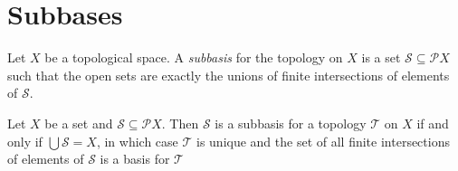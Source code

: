 \section{Subbases}

\begin{df}[Subbasis]
  Let $X$ be a topological space. A \emph{subbasis} for the topology on $X$ is a set $\mathcal{S} \subseteq \mathcal{P} X$ such that the open sets are exactly the unions of finite intersections of elements of $\mathcal{S}$.
\end{df}

\begin{prop}
  \label{prop:subbasis}
  Let $X$ be a set and $\mathcal{S} \subseteq \mathcal{P} X$. Then $\mathcal{S}$ is a subbasis for a topology $\mathcal{T}$ on $X$ if and only if $\bigcup \mathcal{S} = X$,
  in which case $\mathcal{T}$ is unique and the set of all finite intersections of elements of $\mathcal{S}$ is a basis for $\mathcal{T}$
\end{prop}

